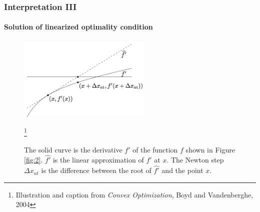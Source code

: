 \documentclass{beamer}
\begin{document}
\begin{frame}
\frametitle{Interpretation III}
\framesubtitle{Solution of linearized optimality condition}
\begin{figure}
\includegraphics[width=2.5in]{linear.png}
\label{fig:3}
\caption{
The solid curve is the derivative $f'$ of the function $f$ shown in Figure
\ref{fig:2}.
$\hat{f'}$ is the linear approximation of $f'$ at $x$. The Newton step
$\Delta x_{nt}$ is the difference between the root of $\hat{f'}$ and the point $x$.
}
\footnote{\tiny
Illustration and caption from \textit{Convex Optimization},  Boyd and Vandenberghe, 2004}
\end{figure}
\end{frame}
\end{document}
